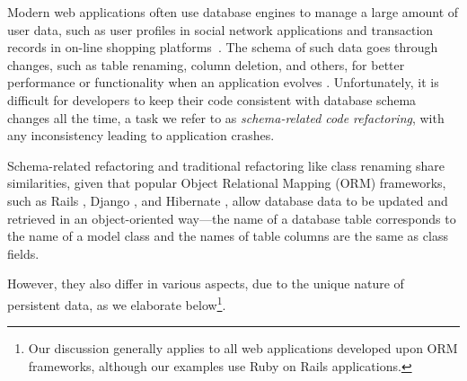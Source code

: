 \label{sec:intro}
Modern web applications often use database engines to 
manage a large amount of user data, such as user profiles in social network applications and transaction
records in on-line shopping platforms~\cite{webapp}.  
The schema of such data goes through changes, such as table renaming, column
deletion, and others, for better performance or functionality when an application evolves \cite{wang2017verifying}.
Unfortunately, it is difficult for developers to keep their code 
consistent with database schema changes all the time, a task we
refer to as \textit{schema-related code refactoring}, with any inconsistency leading
to application crashes.

Schema-related refactoring and
traditional refactoring like class renaming share similarities, given that
popular Object Relational Mapping (ORM) frameworks, such as Rails \cite{rails},  
Django \cite{django}, and Hibernate \cite{hibernate},
allow database data to be
updated and retrieved in an object-oriented way---the name of a database table corresponds to the name of a model class
and the names of table columns are the same as class fields.

However, they also differ in various aspects, due to the unique nature of persistent data,
as we elaborate below\footnote{Our discussion generally applies to
all web applications developed upon ORM frameworks, although our
examples use Ruby on Rails applications.}.






 


